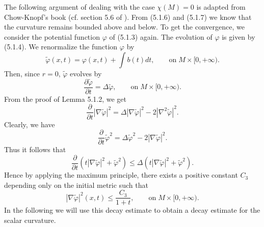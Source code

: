 \smallskip
{}The following argument of dealing with the case $\chi(M)=0$ is
adapted from Chow-Knopf's book (cf. section 5.6 of \cite{CK04}).
From (5.1.6) and (5.1.7) we know that the curvature remains
bounded above and below. To get the convergence, we consider the
potential function $\varphi$ of (5.1.3) again. The evolution of
$\varphi$ is given by (5.1.4). We renormalize the function
$\varphi$ by
$$
\tilde{\varphi}(x,t) =\varphi(x,t)+\int b(t)dt, \qquad \text{on
}\;M\times[0,+\infty).
$$
Then, since $r=0$, $\tilde{\varphi}$ evolves by \begin{equation} \frac{\partial
\tilde{\varphi}}{\partial t} =\Delta\tilde{\varphi},\qquad
\text{on}
\;M\times[0,+\infty).  %
\end{equation} {}From the proof of Lemma 5.1.2, we get \begin{equation} \frac{\partial
}{\partial t}|\nabla \tilde{\varphi}|^2= \Delta|\nabla
\tilde{\varphi}|^2-2|\nabla^2\tilde{\varphi}|^2. %
\end{equation} Clearly, we have \begin{equation} \frac{\partial }{\partial
t}\tilde{\varphi}^2
=\Delta\tilde{\varphi}^2-2|\nabla\tilde{\varphi}|^2. %
\end{equation} Thus it follows that
$$
\frac{\partial }{\partial t}(t|\nabla\tilde{\varphi}|^2
+\tilde{\varphi}^2)\le\Delta(t|\nabla \tilde{\varphi}|^2+
\tilde{\varphi}^2).
$$
Hence by applying the maximum principle, there exists a positive
constant $C_3$ depending only on the initial metric such that \begin{equation}
|\nabla\tilde{\varphi}|^2(x,t)\le \frac{C_3}{1+t},
\qquad \text{on}\;M\times[0,+\infty). %
\end{equation} In the following we will use this decay estimate to obtain a
decay estimate for the scalar curvature.

